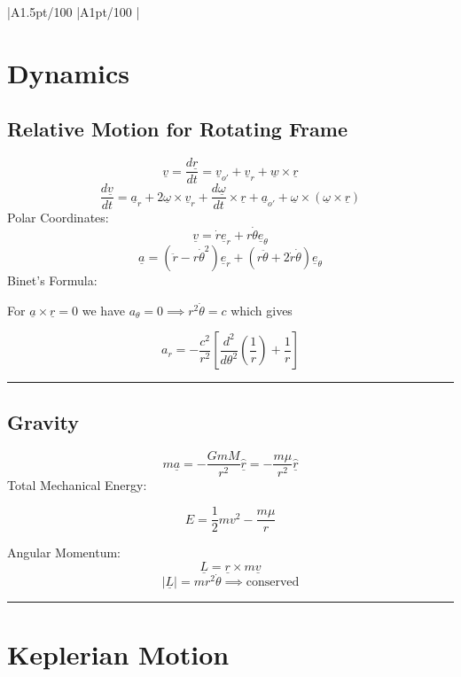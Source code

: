 \documentclass[table,cmyk,fleqn]{article}
\makeatletter
\newcommand\ratio[2]{\strip@pt\dimexpr#1pt/#2\relax}
\makeatother
\begin{document}
\begin{longtable}
{
    |A{1.5}{\ratio{50}{100}}%
    |A{1}{\ratio{50}{100}}%
    |%
}\hline

\section*{Dynamics}
\subsection*{Relative Motion for Rotating Frame}
\[\underline{v} = \frac{d \underline{r}}{d t} = \underline{v}_{o'} + \underline{v}_r + \underline{w} \times \underline{r}\]
\[ \frac{d\underline{v}}{dt} = \underline{a}_r + 2\underline{\omega}\times\underline{v}_r + \frac{d\underline{\omega}}{dt}\times\underline{r}+\underline{a}_{o'}+\underline{\omega}\times(\underline{\omega}\times\underline{r})\]
Polar Coordinates:
\[\underline{v} = \dot{r}\underline{e}_r + r\dot{\theta}\underline{e}_{\theta}\]
\[\underline{a} = (\ddot{r}-r\dot{\theta}^2)\underline{e}_r + (r\ddot{\theta} + 2\dot{r}\dot{\theta})\underline{e}_{\theta}\]
Binet's Formula:

For $\underline{a} \times \underline{r} = 0$ we have $a_{\theta} = 0 \implies r^2 \dot{\theta} = c$ which gives

\[a_r = -\frac{c^2}{r^2}\left[\frac{d^2}{d\theta^2}\left(\frac{1}{r}\right)+\frac{1}{r}\right]\]

\vspace{0.5cm}
\noindent\rule{9cm}{0.4pt}
\subsection*{Gravity}
\[m\underline{a} = -\frac{GmM}{r^2}\underline{\hat{r}} = -\frac{m\mu}{r^2}\underline{\hat{r}}\]
Total Mechanical Energy:
\begin{boldmath}\[E = \frac{1}{2}mv^2 - \frac{m\mu}{r}\]\end{boldmath}
Angular Momentum:
\[\underline{L} = \underline{r}\times m \underline{v} \]
\[|\underline{L}| = mr^2\dot{\theta} \implies \text{conserved}\]

\vspace{0.5cm}
\noindent\rule{9cm}{0.4pt}
\section*{Keplerian Motion}

\end{longtable}
\end{document}
